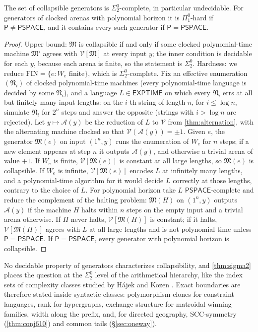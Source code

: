 \documentclass[final]{siamart0516}
\numberwithin{theorem}{section}
\numberwithin{equation}{section}
\theoremstyle{siamnonum}
\theoremstyle{plain}
\newcommand{\val}{\mathcal{V}}            %
\newcommand{\arena}{\mathcal{A}}          %
\newcommand{\cls}[1]{\mathsf{#1}}
\newcommand{\PSPACE}{\cls{PSPACE}}
\newcommand{\EXPTIME}{\cls{EXPTIME}}
\newcommand{\Pclass}{\cls{P}}
\begin{document}
\begin{theorem}\label{thm:sigma2}
The set of collapsible generators is $\Sigma^0_2$-complete, in particular undecidable. For generators of clocked arenas with polynomial horizon it is $\Pi^0_1$-hard if $\Pclass\ne\PSPACE$, and it contains every such generator if $\Pclass=\PSPACE$.
\end{theorem}
\begin{proof}
Upper bound: $\mathfrak M$ is collapsible if and only if some clocked polynomial-time machine $\mathfrak M'$ agrees with $\val[\mathfrak M]$ at every input $y$; the inner condition is decidable for each $y$, because each arena is finite, so the statement is $\Sigma^0_2$.
Hardness: we reduce $\mathrm{FIN}=\{e:W_e\text{ finite}\}$, which is $\Sigma^0_2$-complete. Fix an effective enumeration $(\mathfrak N_i)$ of clocked polynomial-time machines (every polynomial-time language is decided by some $\mathfrak N_i$), and a language $L\in\EXPTIME$ on which every $\mathfrak N_i$ errs at all but finitely many input lengths: on the $i$-th string of length $n$, for $i\le\log n$, simulate $\mathfrak N_i$ for $2^n$ steps and answer the opposite (strings with $i>\log n$ are rejected). Let $y\mapsto\arena(y)$ be the reduction of $L$ to $\val$ from \cref{thm:alternation}, with the alternating machine clocked so that $\val(\arena(y))=\pm1$. Given $e$, the generator $\mathfrak M(e)$ on input $(1^n,y)$ runs the enumeration of $W_e$ for $n$ steps; if a new element appears at step $n$ it outputs $\arena(y)$, and otherwise a trivial arena of value $+1$. If $W_e$ is finite, $\val[\mathfrak M(e)]$ is constant at all large lengths, so $\mathfrak M(e)$ is collapsible. If $W_e$ is infinite, $\val[\mathfrak M(e)]$ encodes $L$ at infinitely many lengths, and a polynomial-time algorithm for it would decide $L$ correctly at those lengths, contrary to the choice of $L$.
For polynomial horizon take $L$ $\PSPACE$-complete and reduce the complement of the halting problem: $\mathfrak M(H)$ on $(1^n,y)$ outputs $\arena(y)$ if the machine $H$ halts within $n$ steps on the empty input and a trivial arena otherwise. If $H$ never halts, $\val[\mathfrak M(H)]$ is constant; if it halts, $\val[\mathfrak M(H)]$ agrees with $L$ at all large lengths and is not polynomial-time unless $\Pclass=\PSPACE$. If $\Pclass=\PSPACE$, every generator with polynomial horizon is collapsible.
\end{proof}

No decidable property of generators characterizes collapsibility, and \cref{thm:sigma2} places the question at the $\Sigma^0_2$ level of the arithmetical hierarchy, like the index sets of complexity classes studied by H\'ajek \cite{Hajek} and Kozen \cite{Kozen}. Exact boundaries are therefore stated inside syntactic classes: polymorphism clones for constraint languages, rank for hypergraphs, exchange structure for matroidal winning families, width along the prefix, and, for directed geography, SCC-symmetry (\cref{thm:conj610}) and common tails (\S\ref{sec:oneway}).
\end{document}
